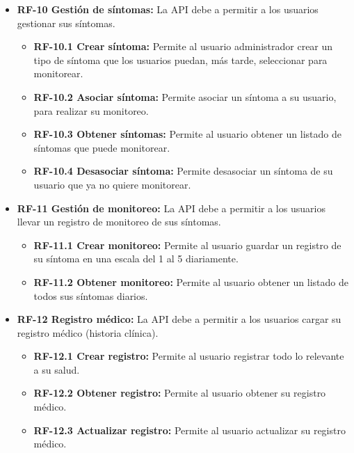 \begin{itemize}
\tightlist
\item
  \textbf{RF-10 Gestión de síntomas:} La API debe a permitir a los usuarios gestionar sus síntomas.\\
  \begin{itemize}
  \tightlist
  \item
    \textbf{RF-10.1 Crear síntoma:} Permite al usuario administrador crear un tipo de síntoma que los usuarios puedan, más tarde, seleccionar para monitorear.\\
 \item
    \textbf{RF-10.2 Asociar síntoma:} Permite asociar un síntoma a su usuario, para realizar su monitoreo.\\
  \item
    \textbf{RF-10.3 Obtener síntomas:} Permite al usuario obtener un listado de síntomas que puede monitorear.\\
 \item
    \textbf{RF-10.4 Desasociar síntoma:} Permite desasociar un síntoma de su usuario que ya no quiere monitorear.\\
\end{itemize}    
\end{itemize}

\begin{itemize}
\tightlist
\item
  \textbf{RF-11 Gestión de monitoreo:} La API debe a permitir a los usuarios llevar un registro de monitoreo de sus síntomas.\\
  \begin{itemize}
  \tightlist
  \item
    \textbf{RF-11.1 Crear monitoreo:} Permite al usuario  guardar un registro de su síntoma en una escala del 1 al 5 diariamente.\\
 \item
    \textbf{RF-11.2 Obtener monitoreo:} Permite al usuario obtener un listado de todos sus síntomas diarios.\\
\end{itemize}    
\end{itemize}


\begin{itemize}
\tightlist
\item
  \textbf{RF-12 Registro médico:} La API debe a permitir a los usuarios cargar su registro médico (historia clínica).\\
  \begin{itemize}
  \tightlist
  \item
    \textbf{RF-12.1 Crear registro:} Permite al usuario registrar todo lo relevante a su salud.\\
 \item
    \textbf{RF-12.2 Obtener registro:} Permite al usuario obtener su registro médico.\\
 \item
    \textbf{RF-12.3 Actualizar registro:} Permite al usuario actualizar su registro médico.
\end{itemize}    
\end{itemize}

